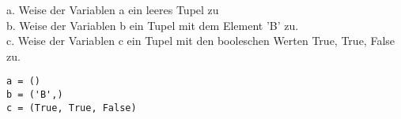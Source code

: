 \question[3]
a. Weise der Variablen a ein leeres Tupel zu \\
b. Weise der Variablen b ein Tupel mit dem Element 'B' zu. \\
c. Weise der Variablen c ein Tupel mit den booleschen Werten True, True, False zu.
\begin{solutionbox}{2cm}
\begin{lstlisting}
a = ()
b = ('B',)
c = (True, True, False)
\end{lstlisting}
\end{solutionbox}
